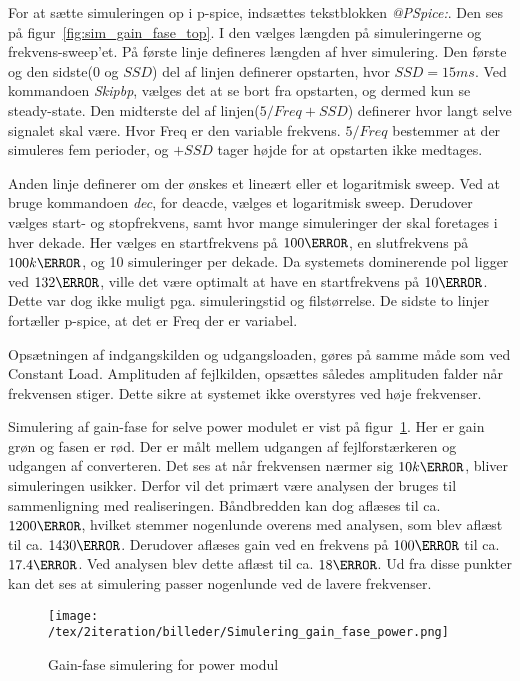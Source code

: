 For at sætte simuleringen op i p-spice, indsættes tekstblokken \textit{@PSpice:}. Den ses på figur~\ref{fig:sim_gain_fase_top}. I den vælges længden på simuleringerne og frekvens-sweep'et. På første linje defineres længden af hver simulering. Den første og den sidste($0$ og $SSD$) del af linjen definerer opstarten, hvor $SSD=15ms$. Ved kommandoen \textit{Skipbp}, vælges det at se bort fra opstarten, og dermed kun se steady-state. Den midterste del af linjen($5/Freq+SSD$) definerer hvor langt selve signalet skal være. Hvor Freq er den variable frekvens. $5/Freq$ bestemmer at der simuleres fem perioder, og $+SSD$ tager højde for at opstarten ikke medtages. 

Anden linje definerer om der ønskes et lineært eller et logaritmisk sweep. Ved at bruge kommandoen \textit{dec}, for deacde, vælges et logaritmisk sweep. Derudover vælges start- og stopfrekvens, samt hvor mange simuleringer der skal foretages i hver dekade. Her vælges en startfrekvens på $100\hertz$, en slutfrekvens på $100k\hertz$, og 10 simuleringer per dekade. Da systemets dominerende pol ligger ved $132\hertz$, ville det være optimalt at have en startfrekvens på $10\hertz$. Dette var dog ikke muligt pga. simuleringstid og filstørrelse. De sidste to linjer fortæller p-spice, at det er Freq der er variabel. 

Opsætningen af indgangskilden og udgangsloaden, gøres på samme måde som ved Constant Load. Amplituden af fejlkilden, opsættes således amplituden falder når frekvensen stiger. Dette sikre at systemet ikke overstyres ved høje frekvenser. 

Simulering af gain-fase for selve power modulet er vist på figur~\ref{fig:sim_gain_fase_power}. Her er gain grøn og fasen er rød. Der er målt mellem udgangen af fejlforstærkeren og udgangen af converteren. Det ses at når frekvensen nærmer sig $10k\hertz$, bliver simuleringen usikker. Derfor vil det primært være analysen der bruges til sammenligning med realiseringen. Båndbredden kan dog aflæses til ca. $1200\hertz$, hvilket stemmer nogenlunde overens med analysen, som blev aflæst til ca. $1430\hertz$. Derudover aflæses gain ved en frekvens på $100\hertz$ til ca. $17.4\decibel$. Ved analysen blev dette aflæst til ca. $18\decibel$. Ud fra disse punkter kan det ses at simulering passer nogenlunde ved de lavere frekvenser. 

\begin{figure}[H]
	\center
	\texttt{[image: /tex/2iteration/billeder/Simulering\_gain\_fase\_power.png]}
	\caption{Gain-fase simulering for power modul}
	\label{fig:sim_gain_fase_power}
\end{figure}

